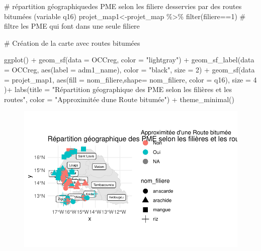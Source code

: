 \documentclass[
  letterpaper,
  DIV=11,
  numbers=noendperiod]{scrartcl}
\newenvironment{Shaded}{\begin{snugshade}}{\end{snugshade}}
\newcommand{\AttributeTok}[1]{\textcolor[rgb]{0.40,0.45,0.13}{#1}}
\newcommand{\CommentTok}[1]{\textcolor[rgb]{0.37,0.37,0.37}{#1}}
\newcommand{\DecValTok}[1]{\textcolor[rgb]{0.68,0.00,0.00}{#1}}
\newcommand{\FunctionTok}[1]{\textcolor[rgb]{0.28,0.35,0.67}{#1}}
\newcommand{\NormalTok}[1]{\textcolor[rgb]{0.00,0.23,0.31}{#1}}
\newcommand{\OtherTok}[1]{\textcolor[rgb]{0.00,0.23,0.31}{#1}}
\newcommand{\SpecialCharTok}[1]{\textcolor[rgb]{0.37,0.37,0.37}{#1}}
\newcommand{\StringTok}[1]{\textcolor[rgb]{0.13,0.47,0.30}{#1}}
\begin{document}
\begin{Shaded}
\begin{Highlighting}[]
\CommentTok{\# répartition géographiquedes PME selon les filiere desservies par des routes bitumées (variable q16)}
\NormalTok{projet\_map1}\OtherTok{\textless{}{-}}\NormalTok{projet\_map }\SpecialCharTok{\%\textgreater{}\%} \FunctionTok{filter}\NormalTok{(filiere}\SpecialCharTok{==}\DecValTok{1}\NormalTok{) }\CommentTok{\# filtre les PME qui font dans une seule filiere}


\CommentTok{\# Création de la carte avec routes bitumées}

\FunctionTok{ggplot}\NormalTok{() }\SpecialCharTok{+}
  \FunctionTok{geom\_sf}\NormalTok{(}\AttributeTok{data =}\NormalTok{ OCCreg, }\AttributeTok{color =} \StringTok{"lightgray"}\NormalTok{) }\SpecialCharTok{+}
  \FunctionTok{geom\_sf\_label}\NormalTok{(}\AttributeTok{data =}\NormalTok{ OCCreg, }\FunctionTok{aes}\NormalTok{(}\AttributeTok{label =}\NormalTok{ adm1\_name), }\AttributeTok{color =} \StringTok{"black"}\NormalTok{, }\AttributeTok{size =} \DecValTok{2}\NormalTok{) }\SpecialCharTok{+}
  \FunctionTok{geom\_sf}\NormalTok{(}\AttributeTok{data =}\NormalTok{ projet\_map1, }\FunctionTok{aes}\NormalTok{(}\AttributeTok{fill =}\NormalTok{ nom\_filiere,}\AttributeTok{shape=}\NormalTok{ nom\_filiere, }\AttributeTok{color =}\NormalTok{ q16), }\AttributeTok{size =} \DecValTok{4}\NormalTok{ )}\SpecialCharTok{+}
  \FunctionTok{labs}\NormalTok{(}\AttributeTok{title =} \StringTok{"Répartition géographique des PME selon les filières et les routes"}\NormalTok{,}
       \AttributeTok{color =} \StringTok{"Approximitée d\textquotesingle{}une Route bitumée"}\NormalTok{) }\SpecialCharTok{+}
  \FunctionTok{theme\_minimal}\NormalTok{() }
\end{Highlighting}
\end{Shaded}

\begin{figure}[H]

{\centering \includegraphics{projet_R_files/figure-pdf/unnamed-chunk-46-1.pdf}

}

\end{figure}
\end{document}
